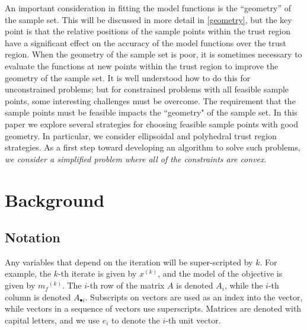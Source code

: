 \documentclass{article}
\theoremstyle{case}
\numberwithin{theorem}{subsection}
\newcommand{\mfk}{{{m}_f}^{(k)}}
\newcommand{\xk}{{x^{(k)}}}
\begin{document}
An important consideration in fitting the model functions is the ``geometry'' of the sample set.
This will be discussed in more detail in \cref{geometry}, but the key point is that the relative positions of the sample points within the trust region have a significant effect on the accuracy of the model functions over the trust region.
When the geometry of the sample set is poor, it is sometimes necessary to evaluate the functions at new points within the trust region to improve the geometry of the sample set.
It is well understood how to do this for unconstrained problems; but for constrained problems with all feasible sample points, some interesting challenges must be overcome.
The requirement that the sample points must be feasible impacts the ``geometry" of the sample set.
In this paper we explore several strategies for choosing feasible sample points with good geometry.
In particular, we consider ellipsoidal and polyhedral trust region strategies.
As a first step toward developing an algorithm to solve such problems, \emph{we consider a simplified problem where all of the constraints are convex}.


\section{Background}

\subsection{Notation}

Any variables that depend on the iteration will be super-scripted by $k$.
For example, the $k$-th iterate is given by $\xk$, and the model of the objective is given by $\mfk$.
The $i$-th row of the matrix $A$ is denoted $A_i$, while the $i$-th column is denoted $A_{\bullet i}$.
Subscripts on vectors are used as an index into the vector, while vectors in a sequence of vectors use superscripts.
Matrices are denoted with capital letters, and we use $e_i$ to denote the $i$-th unit vector.                     %
\end{document}
